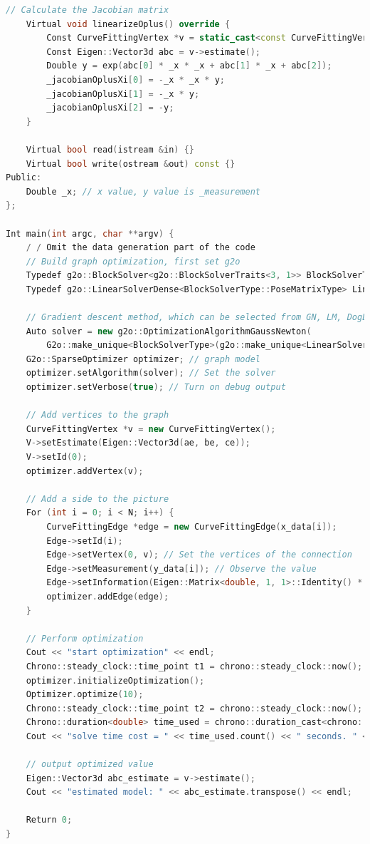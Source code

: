 \begin{lstlisting}[language=c++,caption=slambook/ch6/g2oCurveFitting.cpp]
    // Calculate the Jacobian matrix
    Virtual void linearizeOplus() override {
        Const CurveFittingVertex *v = static_cast<const CurveFittingVertex *> (_vertices[0]);
        Const Eigen::Vector3d abc = v->estimate();
        Double y = exp(abc[0] * _x * _x + abc[1] * _x + abc[2]);
        _jacobianOplusXi[0] = -_x * _x * y;
        _jacobianOplusXi[1] = -_x * y;
        _jacobianOplusXi[2] = -y;
    }
    
    Virtual bool read(istream &in) {}
    Virtual bool write(ostream &out) const {}
Public:
    Double _x; // x value, y value is _measurement
};

Int main(int argc, char **argv) {
    / / Omit the data generation part of the code
    // Build graph optimization, first set g2o
    Typedef g2o::BlockSolver<g2o::BlockSolverTraits<3, 1>> BlockSolverType; // Each error term has an optimized variable dimension of 3 and an error value dimension of 1
    Typedef g2o::LinearSolverDense<BlockSolverType::PoseMatrixType> LinearSolverType; // Linear solver type
    
    // Gradient descent method, which can be selected from GN, LM, DogLeg
    Auto solver = new g2o::OptimizationAlgorithmGaussNewton(
        G2o::make_unique<BlockSolverType>(g2o::make_unique<LinearSolverType>()));
    G2o::SparseOptimizer optimizer; // graph model
    optimizer.setAlgorithm(solver); // Set the solver
    optimizer.setVerbose(true); // Turn on debug output
    
    // Add vertices to the graph
    CurveFittingVertex *v = new CurveFittingVertex();
    V->setEstimate(Eigen::Vector3d(ae, be, ce));
    V->setId(0);
    optimizer.addVertex(v);
    
    // Add a side to the picture
    For (int i = 0; i < N; i++) {
        CurveFittingEdge *edge = new CurveFittingEdge(x_data[i]);
        Edge->setId(i);
        Edge->setVertex(0, v); // Set the vertices of the connection
        Edge->setMeasurement(y_data[i]); // Observe the value
        Edge->setInformation(Eigen::Matrix<double, 1, 1>::Identity() * 1 / (w_sigma * w_sigma)); // Information matrix: the inverse of the covariance matrix
        optimizer.addEdge(edge);
    }
    
    // Perform optimization
    Cout << "start optimization" << endl;
    Chrono::steady_clock::time_point t1 = chrono::steady_clock::now();
    optimizer.initializeOptimization();
    Optimizer.optimize(10);
    Chrono::steady_clock::time_point t2 = chrono::steady_clock::now();
    Chrono::duration<double> time_used = chrono::duration_cast<chrono::duration<double>>(t2 - t1);
    Cout << "solve time cost = " << time_used.count() << " seconds. " << endl;
    
    // output optimized value
    Eigen::Vector3d abc_estimate = v->estimate();
    Cout << "estimated model: " << abc_estimate.transpose() << endl;
    
    Return 0;
}
\end{lstlisting}

